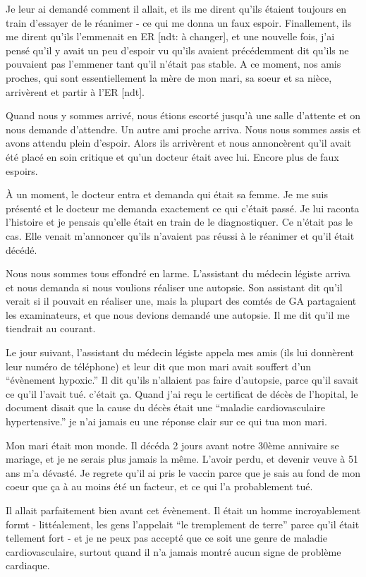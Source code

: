 Je leur ai demandé comment il allait, et ils me dirent qu'ils étaient toujours
en train d'essayer de le réanimer - ce qui me donna un faux espoir. Finallement,
ils me dirent qu'ils l'emmenait en ER [ndt: à changer], et une nouvelle fois,
j'ai pensé qu'il y avait un peu d'espoir vu qu'ils avaient précédemment dit
qu'ils ne pouvaient pas l'emmener tant qu'il n'était pas stable. A ce moment,
nos amis proches, qui sont essentiellement la mère de mon mari, sa soeur et sa
nièce, arrivèrent et partir à l'ER [ndt].

Quand nous y sommes arrivé, nous étions escorté jusqu'à une salle d'attente et
on nous demande d'attendre. Un autre ami proche arriva. Nous nous sommes assis
et avons attendu plein d'espoir. Alors ils arrivèrent et nous annoncèrent qu'il
avait été placé en soin critique et qu'un docteur était avec lui. Encore plus de
faux espoirs.

À un moment, le docteur entra et demanda qui était sa femme. Je me suis présenté
et le docteur me demanda exactement ce qui c'était passé. Je lui raconta
l'histoire et je pensais qu'elle était en train de le diagnostiquer. Ce n'était
pas le cas. Elle venait m'annoncer qu'ils n'avaient pas réussi à le réanimer et
qu'il était décédé.

Nous nous sommes tous effondré en larme. L'assistant du médecin légiste arriva et nous demanda si nous voulions réaliser une autopsie. Son assistant dit qu'il verait si il pouvait en réaliser une, mais la plupart des comtés de GA partagaient les examinateurs, et que nous devions demandé une autopsie. Il me dit qu'il me tiendrait au courant.

Le jour suivant, l'assistant du médecin légiste appela mes amis (ils lui
donnèrent leur numéro de téléphone) et leur dit que mon mari avait souffert d'un
“évènement hypoxic.” Il dit qu'ils n'allaient pas faire d'autopsie, parce qu'il
savait ce qu'il l'avait tué. c'était ça. Quand j'ai reçu le certificat de décès
de l'hopital, le document disait que la cause du décès était une “maladie
cardiovasculaire hypertensive.” je n'ai jamais eu une réponse clair sur ce qui
tua mon mari.

Mon mari était mon monde. Il décéda 2 jours avant notre 30ème annivaire se
mariage, et je ne serais plus jamais la même. L'avoir perdu, et devenir veuve à
51 ans m'a dévasté. Je regrete qu'il ai pris le vaccin parce que je sais au fond
de mon coeur que ça à au moins été un facteur, et ce qui l'a probablement tué.

Il allait parfaitement bien avant cet évènement. Il était un homme
incroyablement formt - littéalement, les gens l'appelait “le tremplement de
terre” parce qu'il était tellement fort - et je ne peux pas accepté que ce soit
une genre de maladie cardiovasculaire, surtout quand il n'a jamais montré aucun
signe de problème cardiaque.

